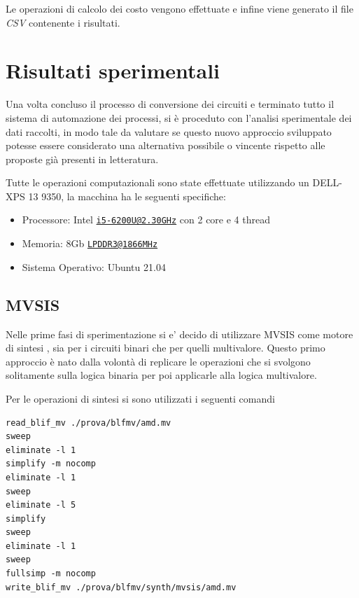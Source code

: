 \documentclass[
]{book}
\providecommand{\tightlist}{%
  \setlength{\itemsep}{0pt}\setlength{\parskip}{0pt}}
\begin{document}
Le operazioni di calcolo dei costo vengono effettuate e infine viene generato il file \emph{CSV} contenente i risultati.

\hypertarget{risultati-sperimentali}{%
\chapter{Risultati sperimentali}\label{risultati-sperimentali}}

Una volta concluso il processo di conversione dei circuiti e terminato tutto il sistema di automazione dei processi, si è proceduto con l'analisi sperimentale dei dati raccolti, in modo tale da valutare se questo nuovo approccio sviluppato potesse essere considerato una alternativa possibile o vincente rispetto alle proposte già presenti in letteratura.

Tutte le operazioni computazionali sono state effettuate utilizzando un DELL-XPS 13 9350, la macchina ha le seguenti specifiche:

\begin{itemize}
\tightlist
\item
  Processore: Intel \href{mailto:i5-6200U@2.30GHz}{\nolinkurl{i5-6200U@2.30GHz}} con 2 core e 4 thread
\item
  Memoria: 8Gb \href{mailto:LPDDR3@1866MHz}{\nolinkurl{LPDDR3@1866MHz}}
\item
  Sistema Operativo: Ubuntu 21.04
\end{itemize}

\newpage

\hypertarget{mvsis-2}{%
\section{MVSIS}\label{mvsis-2}}

Nelle prime fasi di sperimentazione si e' decido di utilizzare MVSIS come motore di sintesi , sia per i circuiti binari che per quelli multivalore. Questo primo approccio è nato dalla volontà di replicare le operazioni che si svolgono solitamente sulla logica binaria per poi applicarle alla logica multivalore.

Per le operazioni di sintesi si sono utilizzati i seguenti comandi

\begin{verbatim}
read_blif_mv ./prova/blfmv/amd.mv
sweep
eliminate -l 1
simplify -m nocomp
eliminate -l 1
sweep
eliminate -l 5
simplify
sweep
eliminate -l 1
sweep
fullsimp -m nocomp
write_blif_mv ./prova/blfmv/synth/mvsis/amd.mv
\end{verbatim}
\end{document}
